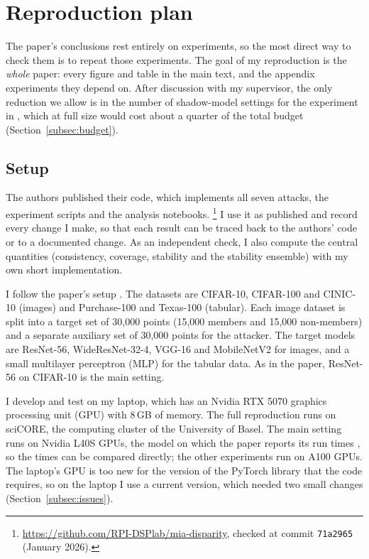 \documentclass[a4paper]{article}
\begin{document}
\section{Reproduction plan}
\label{sec:reproduction}

The paper's conclusions rest entirely on experiments, so the most direct way to check them is to repeat those experiments.
The goal of my reproduction is the \emph{whole} paper: every figure and table in the main text, and the appendix experiments they depend on.
After discussion with my supervisor, the only reduction we allow is in the number of shadow-model settings for the experiment in \citet[Fig.~6]{wang2025mia}, which at full size would cost about a quarter of the total budget (Section~\ref{subsec:budget}).

\subsection{Setup}
\label{subsec:setup}

The authors published their code, which implements all seven attacks, the experiment scripts and the analysis notebooks.%
\footnote{\url{https://github.com/RPI-DSPlab/mia-disparity}, checked at commit \texttt{71a2965} (January 2026).}
I use it as published and record every change I make, so that each result can be traced back to the authors' code or to a documented change.
As an independent check, I also compute the central quantities (consistency, coverage, stability and the stability ensemble) with my own short implementation.

I follow the paper's setup \citep[Sec.~4.1 and App.~A]{wang2025mia}.
The datasets are CIFAR-10, CIFAR-100 and CINIC-10 (images) and Purchase-100 and Texas-100 (tabular).
Each image dataset is split into a target set of 30{,}000 points (15{,}000 members and 15{,}000 non-members) and a separate auxiliary set of 30{,}000 points for the attacker.
The target models are ResNet-56, WideResNet-32-4, VGG-16 and MobileNetV2 for images, and a small multilayer perceptron (MLP) for the tabular data.
As in the paper, ResNet-56 on CIFAR-10 is the main setting.

I develop and test on my laptop, which has an Nvidia RTX 5070 graphics processing unit (GPU) with 8\,GB of memory.
The full reproduction runs on sciCORE, the computing cluster of the University of Basel.
The main setting runs on Nvidia L40S GPUs, the model on which the paper reports its run times \citep[extended version, App.~C.1]{wang2025mia}, so the times can be compared directly; the other experiments run on A100 GPUs.
The laptop's GPU is too new for the version of the PyTorch library that the code requires, so on the laptop I use a current version, which needed two small changes (Section~\ref{subsec:issues}).
\end{document}
